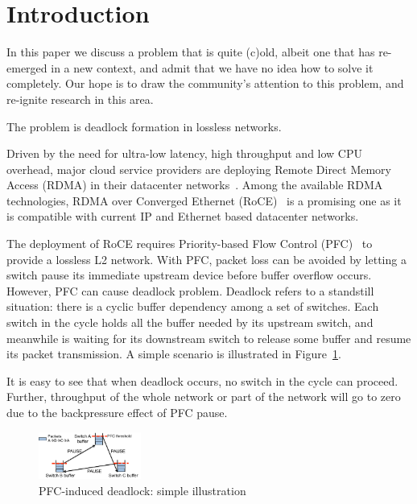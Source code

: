 \secspace
\section{Introduction}
\secspace
\label{sec:intro}

In this paper we discuss a problem that is quite (c)old, albeit one that has
re-emerged in a new context, and admit that we have no idea how to solve it
completely. Our hope is to draw the community's attention to this problem, and
re-ignite research in this area.

The problem is deadlock formation in lossless networks.

Driven by the need for ultra-low latency, high throughput and low CPU overhead,
major cloud service providers are deploying Remote Direct Memory Access (RDMA) in
their datacenter networks~\cite{dcqcn,timely}. Among the
available RDMA technologies,  RDMA over Converged Ethernet (RoCE)~\cite{roce} is
a promising one as it is compatible with current IP and Ethernet based
datacenter networks.

The deployment of RoCE requires Priority-based Flow Control (PFC)~\cite{pfc} to
provide a lossless L2 network. With PFC, packet loss can be avoided by letting a
switch pause its immediate upstream device before buffer overflow occurs.
However, PFC can cause deadlock problem. Deadlock refers to a
standstill situation: there is a cyclic buffer dependency among a set of
switches. Each switch in the cycle holds all the buffer needed by its upstream
switch, and meanwhile is waiting for its downstream switch to release some
buffer and resume its packet transmission. A simple scenario is illustrated in
Figure~\ref{fig:deadlock_example}.

It is easy to see that when deadlock occurs, no switch in the cycle can proceed. Further, throughput of the whole network
or part of the network will go to zero due to the backpressure
effect of PFC pause.

\begin{figure}
	\centering
	\includegraphics[width=0.3\textwidth] {figs/deadlock}
	\vspace{-0.15in}
	\caption{PFC-induced deadlock: simple illustration}
	\vspace{-0.25in}
	\label{fig:deadlock_example}
\end{figure}

